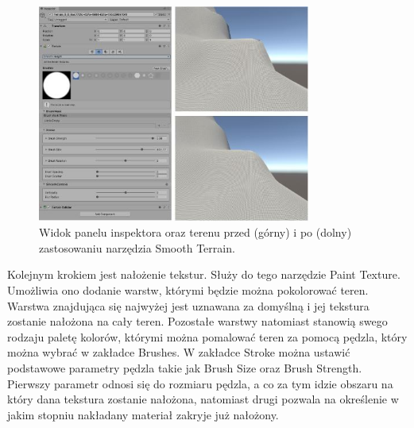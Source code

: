 \begin{figure}[h!]
    \centering
    \includegraphics[width=0.8\textwidth]{images/modelowanie_terenu/rzezbienie.jpg}
    \caption{Widok panelu inspektora oraz terenu przed (górny) i po (dolny) zastosowaniu narzędzia Smooth Terrain.}\label{fig:rzezbienie_terenu}
\end{figure}

Kolejnym krokiem jest nałożenie tekstur. Służy do tego narzędzie Paint Texture. Umożliwia ono dodanie warstw, którymi będzie można pokolorować teren. Warstwa znajdująca się najwyżej jest uznawana za domyślną i jej tekstura zostanie nałożona na cały teren. Pozostałe warstwy natomiast stanowią swego rodzaju paletę kolorów, którymi można pomalować teren za pomocą pędzla, który można wybrać w zakładce Brushes. W zakładce Stroke można ustawić podstawowe parametry pędzla takie jak Brush Size oraz Brush Strength. Pierwszy parametr odnosi się do rozmiaru pędzla, a co za tym idzie obszaru na który dana tekstura zostanie nałożona, natomiast drugi pozwala na określenie w jakim stopniu nakładany materiał zakryje już nałożony.

